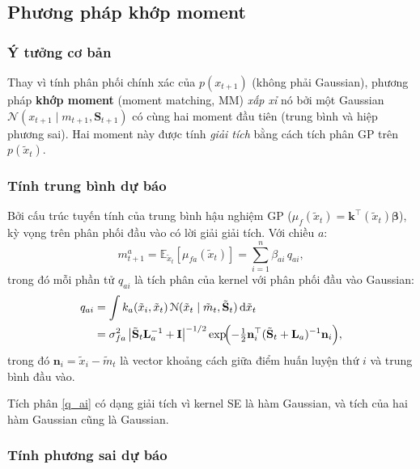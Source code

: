 \subsection{Phương pháp khớp moment}
\label{SUB_SEC_moment_matching}

\subsubsection{Ý tưởng cơ bản}
\label{SUB_SUB_SEC_mm_idea}

Thay vì tính phân phối chính xác của $p(x_{t+1})$ (không phải Gaussian), phương pháp \textbf{khớp moment} (moment matching, MM) \textit{xấp xỉ} nó bởi một Gaussian $\mathcal{N}(x_{t+1} \mid m_{t+1}, \mathbf{S}_{t+1})$ có cùng hai moment đầu tiên (trung bình và hiệp phương sai). Hai moment này được tính \textit{giải tích} bằng cách tích phân GP trên $p(\tilde{x}_t)$.

\subsubsection{Tính trung bình dự báo}
\label{SUB_SUB_SEC_mm_mean}

Bởi cấu trúc tuyến tính của trung bình hậu nghiệm GP ($\mu_f(\tilde{x}_t) = \mathbf{k}^\top(\tilde{x}_t) \boldsymbol{\beta}$), kỳ vọng trên phân phối đầu vào có lời giải giải tích. Với chiều $a$:
\begin{equation}
    m^a_{t+1} = \mathbb{E}_{\tilde{x}_t}[\mu_{fa}(\tilde{x}_t)] = \sum_{i=1}^{n} \beta_{ai}\, q_{ai},
    \label{mm_mean}
\end{equation}
trong đó mỗi phần tử $q_{ai}$ là tích phân của kernel với phân phối đầu vào Gaussian:
\begin{align}
    q_{ai} &= \int k_a(\tilde{x}_i, \tilde{x}_t)\, \mathcal{N}(\tilde{x}_t \mid \tilde{m}_t, \tilde{\mathbf{S}}_t)\, \mathrm{d}\tilde{x}_t \notag \\
    &= \sigma_{fa}^2 \,\bigl|\tilde{\mathbf{S}}_t \mathbf{L}_a^{-1} + \mathbf{I}\bigr|^{-1/2} \exp\!\Bigl(-\tfrac{1}{2} \mathbf{n}_i^\top (\tilde{\mathbf{S}}_t + \mathbf{L}_a)^{-1} \mathbf{n}_i\Bigr),
    \label{q_ai}
\end{align}
trong đó $\mathbf{n}_i = \tilde{x}_i - \tilde{m}_t$ là vector khoảng cách giữa điểm huấn luyện thứ $i$ và trung bình đầu vào.

Tích phân \eqref{q_ai} có dạng giải tích vì kernel SE là hàm Gaussian, và tích của hai hàm Gaussian cũng là Gaussian.

\subsubsection{Tính phương sai dự báo}
\label{SUB_SUB_SEC_mm_variance}

